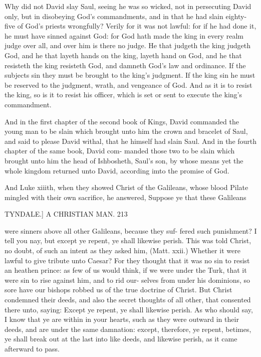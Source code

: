 \documentclass{custom}
\begin{document}
Why did not David slay Saul, seeing he was so wicked,
not in persecuting David only, but in disobeying God's
commandments, and in that he had slain eighty-five of 
God's priests wrongfully? Verily for it was not lawful:
for if he had done it, he must have sinned against God:
for God hath made the king in every realm judge over 
all, and over him is there no judge. He that judgeth the 
king judgeth God, and he that layeth hands on the king, 
layeth hand on God, and he that resisteth the king resisteth
God, and damneth God's law and ordinance. If the 
subjects sin they must be brought to the king's judgment. 
If the king sin he must be reserved to the judgment, 
wrath, and vengeance of God. And as it is to resist the 
king, so is it to resist his officer, which is set or sent to 
execute the king's commandment. 

And in the first chapter of the second book of Kings, 
David commanded the young man to be slain which 
brought unto him the crown and bracelet of Saul, and said 
to please David withal, that he himself had slain Saul.
And in the fourth chapter of the same book, David com- 
manded those two to be slain which brought unto him the 
head of Ishbosheth, Saul's son, by whose means yet the
whole kingdom returned unto David, according imto the 
promise of God.

And Luke xiiith, when they showed Christ of the
Galileans, whose blood Pilate mingled with their own 
sacrifice, he answered, Suppose ye that these Galileans 


TYNDALE.]
A CHRISTIAN MAN.
213

were sinners above all other Galileans, because they suf- 
fered such punishment? I tell you nay, but except ye 
repent, ye shall likewise perish. This was told Christ, 
no doubt, of such an intent as they asked him, (Matt.
xxii.) Whether it were lawful to give tribute unto Caesar?
For they thought that it was no sin to resist an heathen 
prince: as few of us would think, if we were under the 
Turk, that it were sin to rise against him, and to rid our- 
selves from under his dominions, so sore have our bishops 
robbed us of the true doctrine of Christ. But Christ 
condemned their deeds, and also the secret thoughts of 
all other, that consented there unto, saying: Except ye 
repent, ye shall likewise perish. As who should say, I 
know that ye are within in your hearts, such as they were 
outward in their deeds, and are under the same damnation:
except, therefore, ye repent, betimes, ye shall break out 
at the last into like deeds, and likewise perish, as it came 
afterward to pass. 
\end{document}
